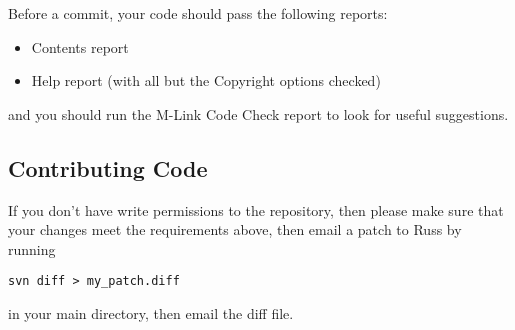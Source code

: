   Before a commit, your code should pass the following reports:
\begin{itemize}
 \item Contents report
  \item  Help report  (with all but the Copyright options checked)
\end{itemize}
  and you should run the M-Link Code Check report to look for useful suggestions.

\subsection{Contributing Code}

If you don't have write permissions to the repository, then please make sure that your changes meet the requirements above, then email a patch to Russ by running 
\begin{lstlisting}
svn diff > my_patch.diff
\end{lstlisting}
in your main \robotlib directory, then email the diff file.

